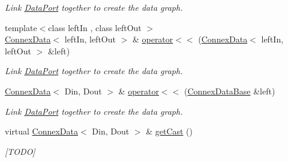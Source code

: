 \begin{DoxyCompactItemize}
\begin{DoxyCompactList}\small\item\em Link \hyperlink{classfilter_1_1data_1_1_data_port}{Data\+Port} together to create the data graph. \end{DoxyCompactList}\item 
{\footnotesize template$<$class left\+In , class left\+Out $>$ }\\\hyperlink{classfilter_1_1data_1_1_connex_data}{Connex\+Data}$<$ left\+In, left\+Out $>$ \& \hyperlink{classfilter_1_1data_1_1_connex_data_af7a3a297477db6925728016cb9c8961a}{operator$<$$<$} (\hyperlink{classfilter_1_1data_1_1_connex_data}{Connex\+Data}$<$ left\+In, left\+Out $>$ \&left)
\begin{DoxyCompactList}\small\item\em Link \hyperlink{classfilter_1_1data_1_1_data_port}{Data\+Port} together to create the data graph. \end{DoxyCompactList}\item 
\hyperlink{classfilter_1_1data_1_1_connex_data}{Connex\+Data}$<$ Din, Dout $>$ \& \hyperlink{classfilter_1_1data_1_1_connex_data_a4a4ad046f5772283f520189e62327376}{operator$<$$<$} (\hyperlink{classfilter_1_1data_1_1_connex_data_base}{Connex\+Data\+Base} \&left)
\begin{DoxyCompactList}\small\item\em Link \hyperlink{classfilter_1_1data_1_1_data_port}{Data\+Port} together to create the data graph. \end{DoxyCompactList}\item 
virtual \hyperlink{classfilter_1_1data_1_1_connex_data}{Connex\+Data}$<$ Din, Dout $>$ \& \hyperlink{classfilter_1_1data_1_1_connex_data_a631260c24ddd1050c75a2732081a2d9d}{get\+Cast} ()
\begin{DoxyCompactList}\small\item\em \mbox{[}T\+O\+DO\mbox{]} \end{DoxyCompactList}\end{DoxyCompactItemize}
